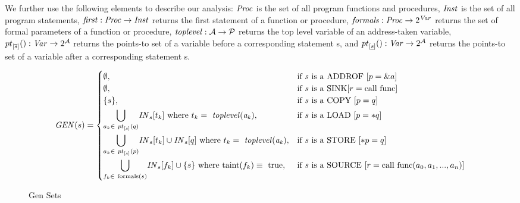 We further use the following elements to describe our analysis:
$\mathit{Proc}$ is the set of all program functions and procedures,
$\mathit{Inst}$ is the set of all program statements,
$\mathit{first}{}: \mathit{Proc} \rightarrow \mathit{Inst}$ returns the first
statement of a function or procedure,
$\mathit{formals}{}: \mathit{Proc} \rightarrow 2^{\mathit{Var}}$ returns the
set of formal parameters of a function or procedure, 
$\mathit{toplevel}{}: \mathcal{A} \rightarrow \mathcal{P}$ returns the top level
variable of an address-taken variable,
${pt}_{[\overline{s}] }(): \mathit{Var} \rightarrow 2^{\mathcal{A}}$ returns the
points-to set of a variable before a corresponding statement s,
and ${pt}_{[\underline{s}]}(): \mathit{Var} \rightarrow 2^{\mathcal{A}}$ returns the
points-to set of a variable after a corresponding statement s.

\begin{figure*}
\[
	\mathit{GEN}(s)	=	
	\begin{cases}
		\emptyset,	&\text{if $s$ is a \addrofdef}	\\
		
		\emptyset,	&\text{if $s$ is a \sinkdef}	\\
			
		\set{s},	&\text{if $s$ is a \copydef}	\\
				
		\mybigcup{a_k \in\ \pointsto{s}{q}}{} \myinflow{}_s[t_k]\ \text{where}\ t_k =\ \mathit{toplevel(a_k)},
			&\text{if $s$ is a \loaddef}	\\		
			
		\mybigcup{a_k \in\ \pointsto{s}{p}}{} \myinflow{}_s[t_k] \cup \myinflow{}_s[q]\ \text{where}\ t_k =\ \mathit{toplevel(a_k)},	
			&\text{if $s$ is a \storedef}	\\
			
		\mybigcup{f_k \in\ \text{formals}(s)}{} \myinflow{}_s[f_k] \cup \set{s}\ \text{where}\ \text{taint}(f_k) \equiv\ \text{true},	
			&\text{if $s$ is a \sourcedef}	
							
	\end{cases}
\]
\caption{Gen Sets}
\end{figure*}

